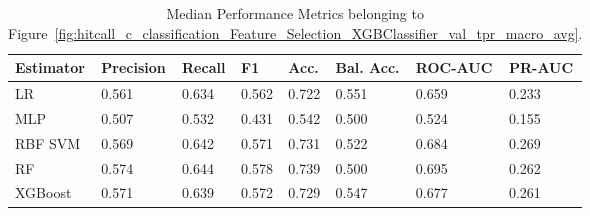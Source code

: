 \begin{longtable}{llllllll}
\caption{Median Performance Metrics belonging to Figure~\ref{fig:hitcall_c_classification_Feature_Selection_XGBClassifier_val_tpr_macro_avg}.}\label{tab:table:hitcall_c_classification_feature_selection_xgbclassifier_val_tpr_macro_avg}\\
\toprule
\midrule
\small Estimator & \small Precision & \small Recall & \small F1 & \small Acc. & \small Bal. Acc. & \small ROC-AUC & \small PR-AUC\\
\hline
LR & 0.561 & 0.634 & 0.562 & 0.722 & 0.551 & 0.659 & 0.233\\
MLP & 0.507 & 0.532 & 0.431 & 0.542 & 0.500 & 0.524 & 0.155\\
RBF SVM & 0.569 & 0.642 & 0.571 & 0.731 & 0.522 & 0.684 & 0.269\\
RF & 0.574 & 0.644 & 0.578 & 0.739 & 0.500 & 0.695 & 0.262\\
XGBoost & 0.571 & 0.639 & 0.572 & 0.729 & 0.547 & 0.677 & 0.261\\
\bottomrule
\end{longtable}